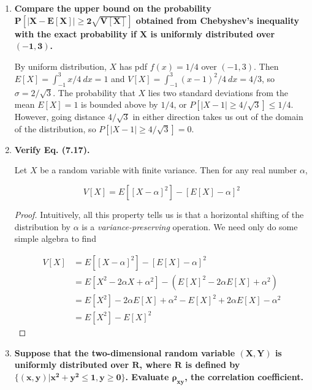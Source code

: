 \documentclass[10pt, oneside]{article}
\begin{document}
\begin{enumerate}[label=7.\arabic*]
\item  \begin{tcolorbox}[
  colback=Cerulean!5!white,
  colframe=Cerulean!75!black]
  \textbf{Compare the upper bound on the probability $\bm{P[|X - E[X]| \geq 2 \sqrt{V[X]}]}$ obtained from Chebyshev's inequality with the exact probability if $\bm{X}$ is uniformly distributed over $\bm{(-1,3)}$.}
  \end{tcolorbox}
  
  By uniform distribution, $X$ has pdf $f(x) = 1/4$ over $(-1,3)$. Then $E[X] = \int^3_{-1} x/4 \ dx = 1$ and $V[X] = \int^3_{-1} (x-1)^2 / 4 \ dx = 4/3$, so $\sigma = 2 / \sqrt{3}$. The probability that $X$ lies two standard deviations from the mean $E[X] = 1$ is bounded above by $1/4$, or $P[|X - 1| \geq 4 / \sqrt{3}] \leq 1/4$. However, going distance $4/\sqrt{3}$ in either direction takes us out of the domain of the distribution, so $\boxed{P[|X - 1| \geq 4 / \sqrt{3}] = 0}$.
  
\item  \begin{tcolorbox}[
  colback=Cerulean!5!white,
  colframe=Cerulean!75!black]
  \textbf{Verify Eq. (7.17).}
  \end{tcolorbox}
  
  \begin{prop*}
  Let $X$ be a random variable with finite variance. Then for any real number $\alpha$,
  
  \[ V[X] = E[[X - \alpha]^2] - [E[X] - \alpha]^2 \]
  \end{prop*}
  
  \begin{proof}
  Intuitively, all this property tells us is that a horizontal shifting of the distribution by $\alpha$ is a \textit{variance-preserving} operation. We need only do some simple algebra to find
  
  \begin{align*}
  V[X] &= E[[X - \alpha]^2] - [E[X] - \alpha]^2 \\
  &= E[X^2 - 2\alpha X + \alpha^2] - (E[X]^2 - 2\alpha E[X] + \alpha^2) \\
  &= E[X^2] - 2\alpha E[X] + \alpha^2 - E[X]^2 + 2\alpha E[X] - \alpha^2 \\
  &= \boxed{E[X^2] - E[X]^2}
  \end{align*}
  \end{proof}
  
\item  \begin{tcolorbox}[
  colback=Cerulean!5!white,
  colframe=Cerulean!75!black]
  \textbf{Suppose that the two-dimensional random variable $\bm{(X,Y)}$ is uniformly distributed over $\bm{R}$, where $\bm{R}$ is defined by $\bm{ \{ (x,y) | x^2 + y^2 \leq 1, y \geq 0 \} }$. Evaluate $\bm{\rho_{xy}}$, the correlation coefficient.}
  \end{tcolorbox}
  

\end{enumerate}
\end{document}
